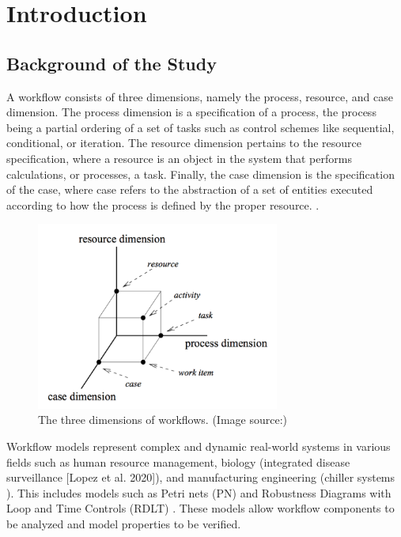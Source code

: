 \chapter{Introduction}\label{chap:intro}
\section{Background of the Study}
\indent A workflow consists of three dimensions, namely the process, resource, and case dimension.  The process dimension is a specification of a process, the process being a partial ordering of a set of tasks such as control schemes like sequential, conditional, or iteration. The resource dimension pertains to the resource specification, where a resource is an object in the system that performs calculations, or processes, a task. Finally, the case dimension is the specification of the case, where case refers to the abstraction of a set of entities executed according to how the process is defined by the proper resource. \cite{Aalst1996} \cite{Malinao2017}.\\
\begin{figure}[]
    \centering
    \includegraphics[width=8cm]{../figures/Workflow Dimensions.png}
    \caption{The three dimensions of workflows. (Image source:\cite{Malinao2017})}
    \label{WorkflowDimensions} 
\end{figure}
\indent Workflow models represent complex and dynamic real-world systems in various fields such as human resource management,  biology (integrated disease surveillance [Lopez et al. 2020]),  and manufacturing engineering (chiller systems \cite{Ramirez2024}). This includes models such as Petri nets (PN) and Robustness Diagrams with Loop and Time Controls (RDLT) \cite{Malinao2017}. These models allow workflow components to be analyzed and model properties to be verified. \\

